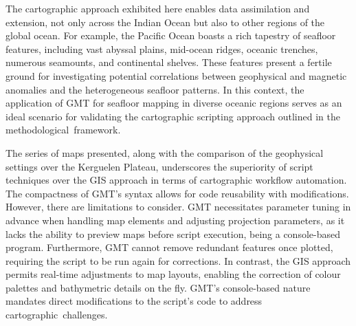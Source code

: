 \documentclass[geomatics,article,accept,pdftex,moreauthors]{Definitions/mdpi}
\begin{document}
The cartographic approach exhibited here enables data assimilation and extension, not only across the Indian Ocean but also to other regions of the global ocean. For example, the Pacific Ocean boasts a rich tapestry of seafloor features, including vast abyssal plains, mid-ocean ridges, oceanic trenches, numerous seamounts, and continental shelves. These features present a fertile ground for investigating potential correlations between geophysical and magnetic anomalies and the heterogeneous seafloor patterns. In this context, the application of GMT for seafloor mapping in diverse oceanic regions serves as an ideal scenario for validating the cartographic scripting approach outlined in the methodological~framework.

The series of maps presented, along with the comparison of the geophysical settings over the Kerguelen Plateau, underscores the superiority of script techniques over the GIS approach in terms of cartographic workflow automation. The compactness of GMT's syntax allows for code reusability with modifications. However, there are limitations to consider. GMT necessitates parameter tuning in advance when handling map elements and adjusting projection parameters, as it lacks the ability to preview maps before script execution, being a console-based program. Furthermore, GMT cannot remove redundant features once plotted, requiring the script to be run again for corrections. In contrast, the GIS approach permits real-time adjustments to map layouts, enabling the correction of colour palettes and bathymetric details on the fly. GMT's console-based nature mandates direct modifications to the script's code to address cartographic~challenges. %






\end{document}
